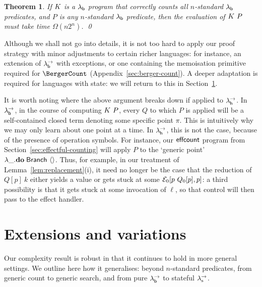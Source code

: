 \documentclass[12pt,phd,lfcs,twoside,openright,logo,leftchapter,normalheadings]{infthesis}
\theoremstyle{plain}
\newtheorem{theorem}{Theorem}[chapter]
\theoremstyle{definition}
\begin{document}
\begin{theorem}
  If $K$ is a $\lambda_{\mathsf{b}}$ program that correctly counts all $n$-standard $\lambda_{\mathsf{b}}$ predicates,
  and $P$ is any $n$-standard $\lambda_{\mathsf{b}}$ predicate, then the evaluation of $K~P$ must take time
  $\Omega(n2^n)$.  \qed
\end{theorem}

Although we shall not go into details, it is not too hard to apply our
proof strategy with minor adjustments to certain richer languages: for
instance, an extension of $\lambda^\rightarrow_{\mathsf{b}}$ with exceptions, or one containing
the memoisation primitive required for $\BergerCount$
(Appendix~\ref{sec:berger-count}). A deeper adaptation is required for
languages with state: we will return to this in
Section~\ref{sec:robustness}.

It is worth noting where the above argument breaks down if applied to $\lambda^\rightarrow_{\mathsf{h}}$.
In $\lambda^\rightarrow_{\mathsf{b}}$, in the course of computing $K~P$, every $Q$ to which $P$ is applied
will be a self-contained closed term denoting some specific point $\pi$.
This is intuitively why we may only learn about one point at a time.
In $\lambda^\rightarrow_{\mathsf{h}}$, this is not the case, because of the presence of operation symbols.
For instance, our $\mathsf{effcount}$ program from Section~\ref{sec:effectful-counting}
will apply $P$ to the `generic point' $\lambda\_.\mathbf{do}\;\mathsf{Branch}~\langle  \rangle$.
Thus, for example, in our treatment of Lemma~\ref{lem:replacement}(i),
it need no longer be the case that the reduction of $Q[p]~k$ either yields a value
or gets stuck at some $\mathcal{E}_0[p~Q_0[p],p]$: a third possibility is that it gets stuck
at some invocation of $\ell$, so that control will then pass to the effect handler.

\section{Extensions and variations}
\label{sec:robustness}

Our complexity result is robust in that it continues to hold in more
general settings. We outline here how it generalises: beyond
$n$-standard predicates, from generic count to generic search, and
from pure $\lambda^\rightarrow_{\mathsf{b}}$ to stateful $\lambda^\rightarrow_{\textrm{\normalfont s}}$.
\end{document}
